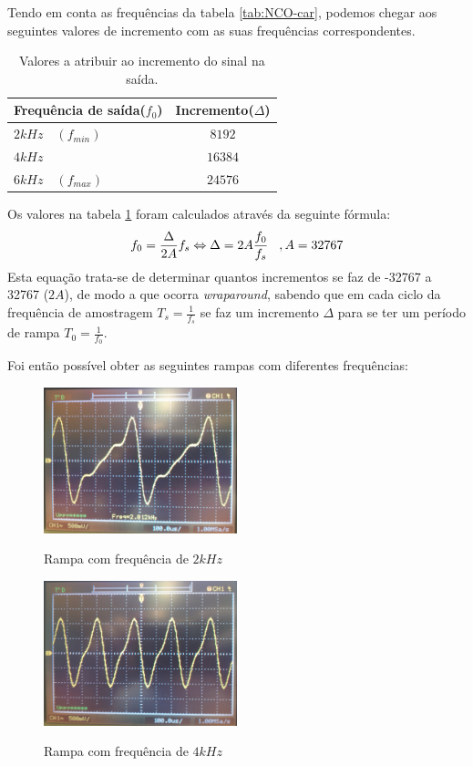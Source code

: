 \documentclass[11pt]{article}
\numberwithin{equation}{section}
\begin{document}
Tendo em conta as frequências da tabela \ref{tab:NCO-car}, podemos chegar aos seguintes valores de incremento com as suas frequências correspondentes.                      
\begin{table}[H]
	\centering
	\caption{Valores a atribuir ao incremento do sinal na saída.}
	\label{tab:incrementos}
	\begin{tabular}[c]{|l||c|}
		\hline \textbf{Frequência de saída($f_0$)} & \textbf{Incremento($\Delta$)}\\ 
		\hline $ 2 kHz \quad (f_{min}) $ & $ 8192 $\\ 
		\hline $ 4 kHz $ & $ 16384 $  \\ 
		\hline $ 6 kHz \quad (f_{max}) $ & $ 24576 $ \\ 
		\hline
	\end{tabular}
\end{table}
Os valores na tabela \ref{tab:incrementos} foram calculados através da seguinte fórmula:
\begin{equation}
 f_{0}= \frac{\Delta}{2A}f_{s} \Leftrightarrow \Delta= 2A\frac{f_{0}}{f_{s}} \hspace{3 mm}, A=32767
\end{equation}
Esta equação trata-se de determinar quantos incrementos se faz de -32767 a 32767 ($2A$), de modo a que ocorra \textit{wraparound}, sabendo que em cada ciclo da frequência de amostragem $T_s=\frac{1}{f_s}$ se faz um incremento $\Delta$ para se ter um período de rampa $T_0=\frac{1}{f_0}$.

Foi então possível obter as seguintes rampas com diferentes frequências:
\begin{figure}[H]
	\centering
	\includegraphics[width=0.5\textwidth]{./P1_2kHz}~\\
	\caption{Rampa com frequência de $ 2 kHz $}
\end{figure}

\begin{figure}[H]
	\centering
	\includegraphics[width=0.5\textwidth]{./P1_4kHz}~\\
	\caption{Rampa com frequência de $ 4 kHz $}
\end{figure}
\end{document}
